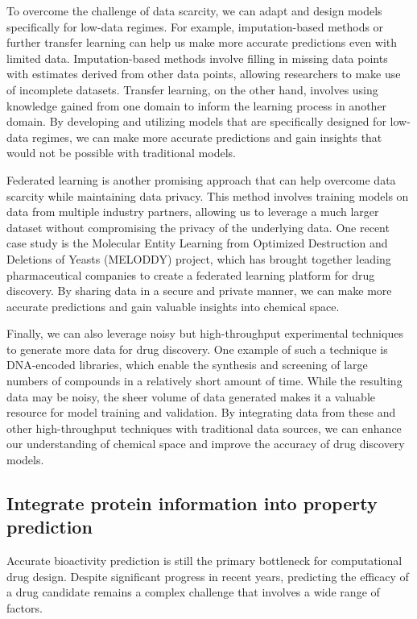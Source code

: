 To overcome the challenge of data scarcity, we can adapt and design models specifically for low-data regimes. For example, imputation-based methods or further transfer learning can help us make more accurate predictions even with limited data. Imputation-based methods involve filling in missing data points with estimates derived from other data points, allowing researchers to make use of incomplete datasets. Transfer learning, on the other hand, involves using knowledge gained from one domain to inform the learning process in another domain. By developing and utilizing models that are specifically designed for low-data regimes, we can make more accurate predictions and gain insights that would not be possible with traditional models.

Federated learning is another promising approach that can help overcome data scarcity while maintaining data privacy. This method involves training models on data from multiple industry partners, allowing us to leverage a much larger dataset without compromising the privacy of the underlying data. One recent case study is the Molecular Entity Learning from Optimized Destruction and Deletions of Yeasts (MELODDY) project, which has brought together leading pharmaceutical companies to create a federated learning platform for drug discovery. By sharing data in a secure and private manner, we can make more accurate predictions and gain valuable insights into chemical space.

Finally, we can also leverage noisy but high-throughput experimental techniques to generate more data for drug discovery. One example of such a technique is DNA-encoded libraries, which enable the synthesis and screening of large numbers of compounds in a relatively short amount of time. While the resulting data may be noisy, the sheer volume of data generated makes it a valuable resource for model training and validation. By integrating data from these and other high-throughput techniques with traditional data sources, we can enhance our understanding of chemical space and improve the accuracy of drug discovery models.

\subsection{Integrate protein information into property prediction}
Accurate bioactivity prediction is still the primary bottleneck for computational drug design. Despite significant progress in recent years, predicting the efficacy of a drug candidate remains a complex challenge that involves a wide range of factors.

